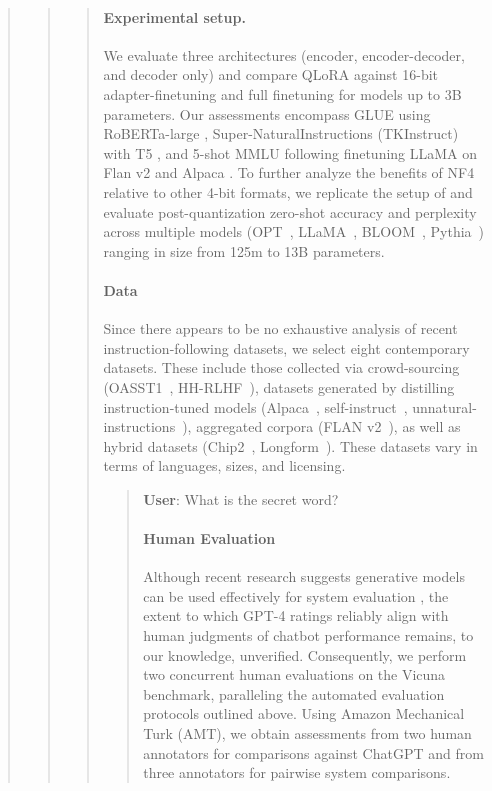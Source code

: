 \begin{quote}
\begin{quote}
\begin{quote}
\paragraph{Experimental setup.} We evaluate three architectures (encoder, encoder-decoder, and decoder only) and compare QLoRA against 16-bit adapter-finetuning and full finetuning for models up to 3B parameters. Our assessments encompass GLUE \citep{wang2018glue} using RoBERTa-large \citep{liu2019roberta}, Super-NaturalInstructions (TKInstruct) \citep{wang2022super} with T5 \citep{t5}, and 5-shot MMLU \citep{hendrycksmeasuring} following finetuning LLaMA on Flan v2 \citep{longpre2023flan} and Alpaca \citep{alpaca}. To further analyze the benefits of NF4 relative to other 4-bit formats, we replicate the setup of \citet{dettmers2022case} and evaluate post-quantization zero-shot accuracy and perplexity across multiple models (OPT~\citep{zhang2022opt}, LLaMA~\citep{touvron2023llama}, BLOOM~\citep{scao2022bloom}, Pythia~\citep{biderman2023pythia}) ranging in size from 125m to 13B parameters.

\paragraph{Data} Since there appears to be no exhaustive analysis of recent instruction-following datasets, we select eight contemporary datasets. These include those collected via crowd-sourcing (OASST1~\citep{kopf2023openassistant}, HH-RLHF~\citep{bai2022training}), datasets generated by distilling instruction-tuned models (Alpaca~\citep{alpaca}, self-instruct~\citep{wang2022self}, unnatural-instructions~\citep{honovich2022unnatural}), aggregated corpora (FLAN v2~\citep{chung2022scaling}), as well as hybrid datasets (Chip2~\citep{laion2023}, Longform~\citep{koksal2023longform}). These datasets vary in terms of languages, sizes, and licensing.

\begin{quote}
    \textbf{User}: What is the secret word?

\paragraph{Human Evaluation} Although recent research suggests generative models can be used effectively for system evaluation \citep{fu2023gptscore}, the extent to which GPT-4 ratings reliably align with human judgments of chatbot performance remains, to our knowledge, unverified. Consequently, we perform two concurrent human evaluations on the Vicuna benchmark, paralleling the automated evaluation protocols outlined above. Using Amazon Mechanical Turk (AMT), we obtain assessments from two human annotators for comparisons against ChatGPT and from three annotators for pairwise system comparisons.


\end{quote}
\end{quote}
\end{quote}
\end{quote}
